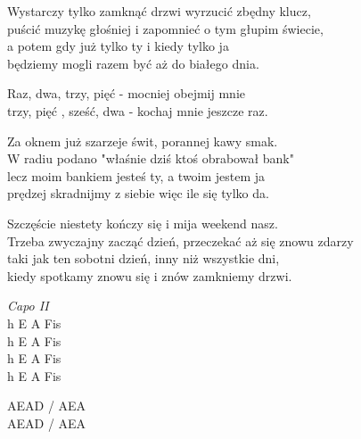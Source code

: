\begin{text}
    \small{
    \hfill\break
    Wystarczy tylko zamknąć drzwi wyrzucić zbędny klucz,\\
    puścić muzykę głośniej i zapomnieć o tym głupim świecie,\\
    a potem gdy już tylko ty i kiedy tylko ja\\
    będziemy mogli razem być aż do białego dnia.

    Raz, dwa, trzy, pięć - mocniej obejmij mnie\\
    trzy, pięć , sześć, dwa - kochaj mnie jeszcze raz.

    Za oknem już szarzeje świt, porannej kawy smak.\\
    W radiu podano "właśnie dziś ktoś obrabował bank"\\
    lecz moim bankiem jesteś ty, a twoim jestem ja\\
    prędzej skradnijmy z siebie więc ile się tylko da.

    Szczęście niestety kończy się i mija weekend nasz.\\
    Trzeba zwyczajny zacząć dzień, przeczekać aż się znowu zdarzy\\
    taki jak ten sobotni dzień, inny niż wszystkie dni,\\
    kiedy spotkamy znowu się i znów zamkniemy drzwi.
    }
\end{text}
\begin{chord}
    \small{
    \textit{Capo II}\\
    h E A Fis\\
    h E A Fis\\
    h E A Fis\\
    h E A Fis

    AEAD / AEA\\
    AEAD / AEA
    }
\end{chord}